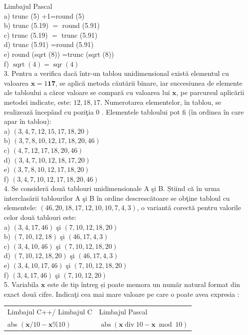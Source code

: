 \documentclass[10pt]{article}
\begin{document}
Limbajul Pascal\\
a) trunc (5) +1=round (5)\\
b) trunc (5.19) $=$ round (5.91)\\
c) trunc (5.19) $=$ trunc (5.91)\\
d) trunc (5.91) =round (5.91)\\
e) round (sqrt (8)) =trunc (sqrt (8))\\
f) $\operatorname{sqrt}(4)=\operatorname{sqr}(4)$\\
3. Pentru a verifica dacă într-un tablou unidimensional există elementul cu valoarea $\mathbf{x}=1 \mathbf{1 7}$, se aplică metoda căutării binare, iar succesiunea de elemente ale tabloului a căror valoare se compară cu valoarea lui $\mathbf{x}$, pe parcursul aplicării metodei indicate, este: $12,18,17$. Numerotarea elementelor, în tablou, se realizează începând cu poziţia 0 . Elementele tabloului pot fi (în ordinea în care apar în tablou):\\
a) $(3,4,7,12,15,17,18,20)$\\
b) $(3,7,8,10,12,17,18,20,46)$\\
c) $(4,7,12,17,18,20,46)$\\
d) $(3,4,7,10,12,18,17,20)$\\
e) $(3,7,8,10,12,17,18,20)$\\
f) $(3,4,7,10,12,17,18,20,46)$\\
4. Se consideră două tablouri unidimensionale A şi B. Știind că în urma interclasării tablourilor A şi B în ordine descrescătoare se obţine tabloul cu elementele: $(46,20,18,17,12,10,10,7,4,3)$, o variantă corectă pentru valorile celor două tablouri este:\\
a) $(3,4,17,46)$ şi $(7,10,12,18,20)$\\
b) $(7,10,12,18)$ şi $(46,17,4,3)$\\
c) $(3,4,10,46)$ şi $(7,10,12,18,20)$\\
d) $(7,10,12,18,20)$ şi $(46,17,4,3)$\\
e) $(3,4,10,17,46)$ şi $(7,10,12,18,20)$\\
f) $(3,4,17,46)$ şi $(7,10,12,20)$\\
5. Variabila $\mathbf{x}$ este de tip întreg și poate memora un număr natural format din exact două cifre. Indicaţi cea mai mare valoare pe care o poate avea expresia :

\begin{center}
\begin{tabular}{l|l}
Limbajul C++/ Limbajul C & Limbajul Pascal \\
abs $(\mathbf{x} / 10-\mathbf{x} \% 10)$ & $\operatorname{abs}(\mathbf{x} \operatorname{div} 10-\mathbf{x} \bmod 10)$ \\
\end{tabular}
\end{center}
\end{document}
